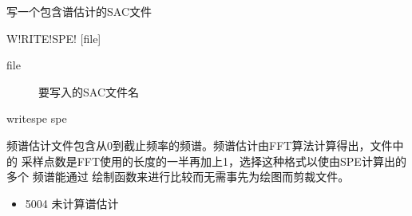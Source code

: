 \label{spe:writespe}

写一个包含谱估计的SAC文件

\begin{SACSTX}
W!RITE!SPE! [file]
\end{SACSTX}

\begin{description}
\item [file] 要写入的SAC文件名
\end{description}

\begin{SACDFT}
writespe spe
\end{SACDFT}

频谱估计文件包含从0到截止频率的频谱。频谱估计由FFT算法计算得出，文件中的
采样点数是FFT使用的长度的一半再加上1，选择这种格式以使由SPE计算出的多个
频谱能通过  绘制函数来进行比较而无需事先为绘图而剪裁文件。

\begin{itemize}
\item 5004 未计算谱估计
\end{itemize}
